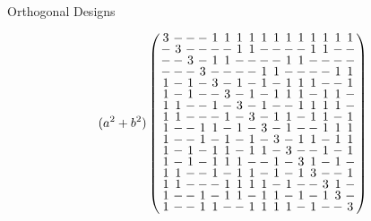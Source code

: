 \documentclass{beamer}
\begin{document}
\begin{frame}{Orthogonal Designs}

  \[
      (a^2+b^2)
      \arraycolsep=1.0pt\def\arraystretch{0.75}
      \left(
      \begin{array}{cccccccccccccccc}
        3&-&-&-&1&1&1&1&1&1&1&1&1&1&1&1\\
        -&3&-&-&-&-&1&1&-&-&-&-&1&1&-&-\\
        -&-&3&-&1&1&-&-&-&-&1&1&-&-&-&-\\
        -&-&-&3&-&-&-&-&1&1&-&-&-&-&1&1\\
        1&-&1&-&3&-&1&-&1&-&1&1&1&-&-&1\\
        1&-&1&-&-&3&-&1&-&1&1&1&-&1&1&-\\
        1&1&-&-&1&-&3&-&1&-&-&1&1&1&1&-\\
        1&1&-&-&-&1&-&3&-&1&1&-&1&1&-&1\\
        1&-&-&1&1&-&1&-&3&-&1&-&-&1&1&1\\
        1&-&-&1&-&1&-&1&-&3&-&1&1&-&1&1\\
        1&-&1&-&1&1&-&1&1&-&3&-&-&1&-&1\\
        1&-&1&-&1&1&1&-&-&1&-&3&1&-&1&-\\
        1&1&-&-&1&-&1&1&-&1&-&1&3&-&-&1\\
        1&1&-&-&-&1&1&1&1&-&1&-&-&3&1&-\\
        1&-&-&1&-&1&1&-&1&1&-&1&-&1&3&-\\
        1&-&-&1&1&-&-&1&1&1&1&-&1&-&-&3\\
      \end{array}
    \right)
  \]
  
\end{frame}
\end{document}

